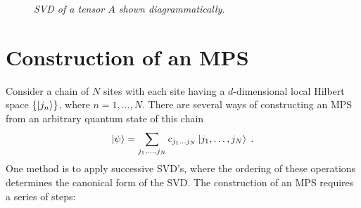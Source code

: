 \begin{figure}[h!]
	\centering
	
	\caption{\textit{SVD of a tensor $A$ shown diagrammatically.}}
	\label{fig:SVD}
\end{figure}


\section{Construction of an MPS} \label{sec:construct_MPS}

Consider a chain of $N$ sites with each site having a $d$-dimensional local Hilbert space $\{ \ket{j_n} \}$, where $n = 1, \ldots, N$. There are several ways of constructing an MPS from an arbitrary quantum state of this chain
\begin{equation}
	\ket{\psi} = \sum_{j_1, \ldots, j_N} c_{j_1 \ldots j_N} \ket{j_1, \ldots, j_N} \; .
	\label{eq:arbstate}
\end{equation}
One method is to apply successive SVD's, where the ordering of these operations determines the canonical form of the SVD. The construction of an MPS requires a series of steps:
